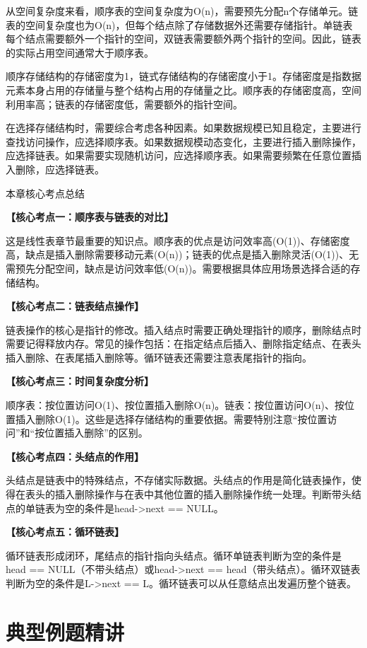 \documentclass[12pt, a4paper]{article}
\newenvironment{bluebox}{\begin{framed}\begin{minipage}{\linewidth}}{\end{minipage}\end{framed}}
\begin{document}
从空间复杂度来看，顺序表的空间复杂度为O(n)，需要预先分配n个存储单元。链表的空间复杂度也为O(n)，但每个结点除了存储数据外还需要存储指针。单链表每个结点需要额外一个指针的空间，双链表需要额外两个指针的空间。因此，链表的实际占用空间通常大于顺序表。

顺序存储结构的存储密度为1，链式存储结构的存储密度小于1。存储密度是指数据元素本身占用的存储量与整个结构占用的存储量之比。顺序表的存储密度高，空间利用率高；链表的存储密度低，需要额外的指针空间。

在选择存储结构时，需要综合考虑各种因素。如果数据规模已知且稳定，主要进行查找访问操作，应选择顺序表。如果数据规模动态变化，主要进行插入删除操作，应选择链表。如果需要实现随机访问，应选择顺序表。如果需要频繁在任意位置插入删除，应选择链表。

\begin{bluebox}{本章核心考点总结}

	\textbf{【核心考点一：顺序表与链表的对比】}

	这是线性表章节最重要的知识点。顺序表的优点是访问效率高(O(1))、存储密度高，缺点是插入删除需要移动元素(O(n))；链表的优点是插入删除灵活(O(1))、无需预先分配空间，缺点是访问效率低(O(n))。需要根据具体应用场景选择合适的存储结构。

	\textbf{【核心考点二：链表结点操作】}

	链表操作的核心是指针的修改。插入结点时需要正确处理指针的顺序，删除结点时需要记得释放内存。常见的操作包括：在指定结点后插入、删除指定结点、在表头插入删除、在表尾插入删除等。循环链表还需要注意表尾指针的指向。

	\textbf{【核心考点三：时间复杂度分析】}

	顺序表：按位置访问O(1)、按位置插入删除O(n)。链表：按位置访问O(n)、按位置插入删除O(1)。这些是选择存储结构的重要依据。需要特别注意“按位置访问”和“按位置插入删除”的区别。

	\textbf{【核心考点四：头结点的作用】}

	头结点是链表中的特殊结点，不存储实际数据。头结点的作用是简化链表操作，使得在表头的插入删除操作与在表中其他位置的插入删除操作统一处理。判断带头结点的单链表为空的条件是head->next == NULL。

	\textbf{【核心考点五：循环链表】}

	循环链表形成闭环，尾结点的指针指向头结点。循环单链表判断为空的条件是head == NULL（不带头结点）或head->next == head（带头结点）。循环双链表判断为空的条件是L->next == L。循环链表可以从任意结点出发遍历整个链表。
\end{bluebox}

\section{典型例题精讲}
\end{document}

